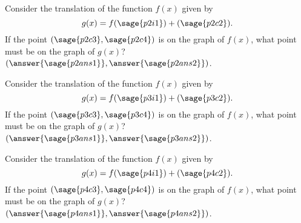 \documentclass{ximera}
\begin{document}
\begin{problem}
    Consider the translation of the function $f(x)$ given by 
    \[
        g(x) = f( \sage{p2i1} ) + (\sage{p2c2}).
    \] 
    If the point $(\sage{p2c3}, \sage{p2c4})$ is on the graph of $f(x)$, what point must be on the graph of $g(x)$? $(\answer{\sage{p2ans1}},\answer{\sage{p2ans2}})$.
\end{problem}


\begin{problem}
    Consider the translation of the function $f(x)$ given by 
    \[
        g(x) = f( \sage{p3i1} ) + (\sage{p3c2}).
    \] 
    If the point $(\sage{p3c3}, \sage{p3c4})$ is on the graph of $f(x)$, what point must be on the graph of $g(x)$? $(\answer{\sage{p3ans1}},\answer{\sage{p3ans2}})$.
\end{problem}


\begin{problem}
    Consider the translation of the function $f(x)$ given by 
    \[
        g(x) = f( \sage{p4i1} ) + (\sage{p4c2}).
    \] 
    If the point $(\sage{p4c3}, \sage{p4c4})$ is on the graph of $f(x)$, what point must be on the graph of $g(x)$? $(\answer{\sage{p4ans1}},\answer{\sage{p4ans2}})$.
\end{problem}
\end{document}
